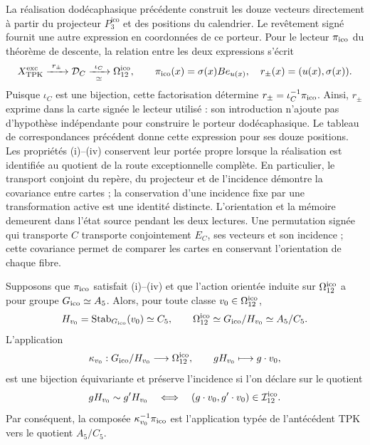La réalisation dodécaphasique précédente construit les douze vecteurs
directement à partir du projecteur \(P_3^{\mathrm{ico}}\) et des positions du calendrier.
Le revêtement signé fournit une autre expression en coordonnées de ce
porteur. Pour le lecteur \(\pi_{\rm ico}\) du théorème de descente,
la relation entre les deux expressions s'écrit
\begin{equation}
 X_{\rm TPK}^{\rm exc}\xrightarrow{\ r_\pm\ }
 \mathcal D_C\xrightarrow[\simeq]{\ \iota_C\ }
 \Omega_{12}^{\rm ico},\qquad
 \pi_{\rm ico}(x)=\sigma(x)Be_{u(x)},\quad
 r_\pm(x)=(u(x),\sigma(x)).
 \label{ii:ii:ico:factorizacion-lector}
\end{equation}
Puisque \(\iota_C\) est une bijection, cette factorisation détermine
\(r_\pm=\iota_C^{-1}\pi_{\rm ico}\). Ainsi, \(r_\pm\) exprime
dans la carte signée le lecteur utilisé : son introduction
n'ajoute pas d'hypothèse indépendante pour construire le porteur
dodécaphasique. Le tableau de correspondances précédent donne cette expression
pour ses douze positions. Les propriétés (i)--(iv) conservent leur
portée propre lorsque la réalisation est identifiée au quotient
de la route exceptionnelle complète. En particulier, le transport conjoint
du repère, du projecteur et de l'incidence démontre la covariance entre cartes ;
la conservation d'une incidence fixe par une transformation active
est une identité distincte. L'orientation et la mémoire demeurent
dans l'état source pendant les deux lectures.
Une permutation signée qui transporte \(C\) transporte conjointement
\(E_C\), ses vecteurs et son incidence ; cette covariance permet de comparer
les cartes en conservant l'orientation de chaque fibre.



\begin{theorem}
\label{ii:ii:pent:thm:gravity-exceptional-descent}
Supposons que \(\pi_{\rm ico}\) satisfait (i)--(iv) et que l’action
orientée induite sur \(\Omega_{12}^{\rm ico}\) a pour groupe
\(G_{\rm ico}\simeq A_5\). Alors, pour toute classe
\(v_0\in\Omega_{12}^{\rm ico}\),
\begin{equation}
\label{ii:ii:pent:eq:gravity-icosahedral-quotient}
H_{v_0}=\operatorname{Stab}_{G_{\rm ico}}(v_0)\simeq C_5,
\qquad
\Omega_{12}^{\rm ico}\simeq G_{\rm ico}/H_{v_0}\simeq A_5/C_5.
\end{equation}
L’application
\begin{equation}
\label{ii:ii:pent:eq:gravity-coset-map}
\kappa_{v_0}:G_{\rm ico}/H_{v_0}\longrightarrow\Omega_{12}^{\rm ico},
\qquad gH_{v_0}\longmapsto g\cdot v_0,
\end{equation}
est une bijection équivariante et préserve l’incidence si l’on déclare sur le quotient
\begin{equation}
\label{ii:ii:pent:eq:gravity-coset-incidence}
gH_{v_0}\sim g'H_{v_0}
\quad\Longleftrightarrow\quad
(g\cdot v_0,g'\cdot v_0)\in\mathcal I_{12}^{\rm ico}.
\end{equation}
Par conséquent, la composée \(\kappa_{v_0}^{-1}\pi_{\rm ico}\) est l’application
typée de l’antécédent TPK vers le quotient \(A_5/C_5\).
\end{theorem}

